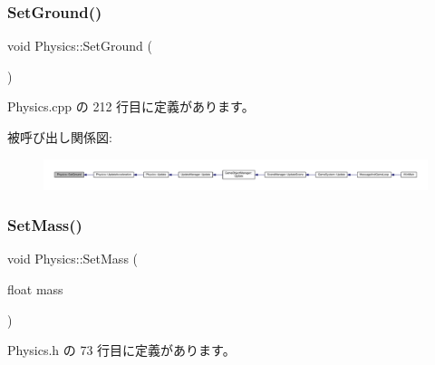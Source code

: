 \subsubsection{\texorpdfstring{Set\+Ground()}{SetGround()}}
{\footnotesize\ttfamily void Physics\+::\+Set\+Ground (\begin{DoxyParamCaption}{ }\end{DoxyParamCaption})\hspace{0.3cm}{\ttfamily [private]}}



 Physics.\+cpp の 212 行目に定義があります。

被呼び出し関係図\+:
\nopagebreak
\begin{figure}[H]
\begin{center}
\leavevmode
\includegraphics[width=350pt]{class_physics_a5bb34919242bdb3472e574b7e024b7e7_icgraph}
\end{center}
\end{figure}
\mbox{\label{class_physics_a7a6eac8c5f6d7db0baef290710825085}} 
\subsubsection{\texorpdfstring{Set\+Mass()}{SetMass()}}
{\footnotesize\ttfamily void Physics\+::\+Set\+Mass (\begin{DoxyParamCaption}\item[{float}]{mass }\end{DoxyParamCaption})\hspace{0.3cm}{\ttfamily [inline]}}



 Physics.\+h の 73 行目に定義があります。


